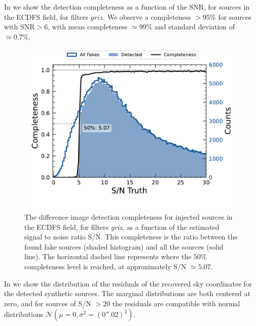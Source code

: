 In  we show the detection completeness as a function of the \gls{SNR}, for sources in the \gls{ECDFS} field, for filters $griz$. 
We observe a completeness $>95\%$ for sources with \gls{SNR}$> 6$, with mean completeness $\simeq 99\%$ and standard deviation of $\simeq 0.7\%$.
%
\begin{figure}[htb!]
\centering
\includegraphics[width=0.98\linewidth]{figures/efficiency_snr_griz.pdf}
\caption{The difference image detection completeness for injected sources in the \gls{ECDFS} field, for filters \textit{griz}, as a function of the estimated signal to noise ratio S/N. This completeness is the ratio between the found fake sources (shaded histogram) and all the sources (solid line). The horizontal dashed line represents where the $50\%$ completeness level is reached, at approximately S/N $\simeq 5.07$.}
\label{fig:eff_snr_griz}
\vspace{0.1cm}
\end{figure}
%
In  we show the distribution of the residuals of the recovered sky coordinates for the detected synthetic sources. The marginal distributions are both centered at zero, and for sources of S/N $>20$ the residuals are compatible with normal distributions $\mathcal{N}(\mu=0, \sigma^2=(0''.02)^2)$.
%
